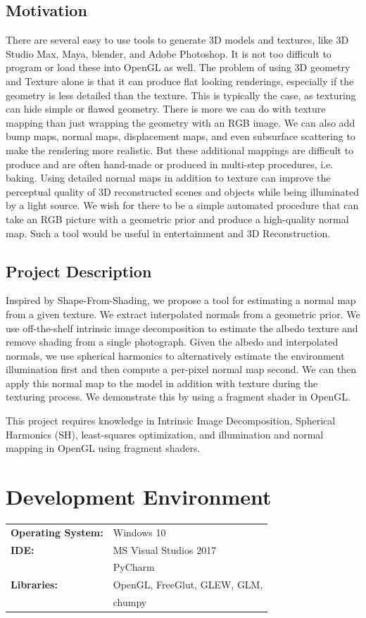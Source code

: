 \documentclass[10pt,twocolumn,letterpaper]{article}
\begin{document}
\subsection{Motivation}
 There are several easy to use tools to generate 3D models and textures, like 3D Studio Max, Maya, blender, and Adobe Photoshop. It is not too difficult to program or load these into OpenGL as well. The problem of using 3D geometry and Texture alone is that it can produce flat looking renderings, especially if the geometry is less detailed than the texture. This is typically the case, as texturing can hide simple or flawed geometry. There is more we can do with texture mapping than just wrapping the geometry with an RGB image. We can also add bump maps, normal maps, displacement maps, and even subsurface scattering to make the rendering more realistic. But these additional mappings are difficult to produce and are often hand-made or produced in multi-step procedures, i.e. baking. Using detailed normal maps in addition to texture can improve the perceptual quality of 3D reconstructed scenes and objects while being illuminated by a light source. We wish for there to be a simple automated procedure that can take an RGB picture with a geometric prior and produce a high-quality normal map. Such a tool would be useful in entertainment and 3D Reconstruction.


\subsection{Project Description}
Inspired by Shape-From-Shading, we propose a tool for estimating a normal map from a given texture. We extract interpolated normals from a geometric prior. We use off-the-shelf intrinsic image decomposition to estimate the albedo texture and remove shading from a single photograph. Given the albedo and interpolated normals, we use spherical harmonics to alternatively estimate the environment illumination first and then compute a per-pixel normal map second. We can then apply this normal map to the model in addition with texture during the texturing process. We demonstrate this by using a fragment shader in OpenGL. \par
This project requires knowledge in Intrinsic Image Decomposition, Spherical Harmonics (SH), least-squares optimization, and illumination and normal mapping in OpenGL using fragment shaders.

\section{Development Environment}
\begin{table}[h]
	\begin{tabular}{ll}
		\textbf{Operating System:} &  Windows 10  \\
		\textbf{IDE:} &  MS Visual Studios 2017  \\
        &PyCharm\\
		\textbf{Libraries:} &  OpenGL, FreeGlut, GLEW, GLM,\\
		&chumpy
	\end{tabular}
\end{table}
\end{document}
